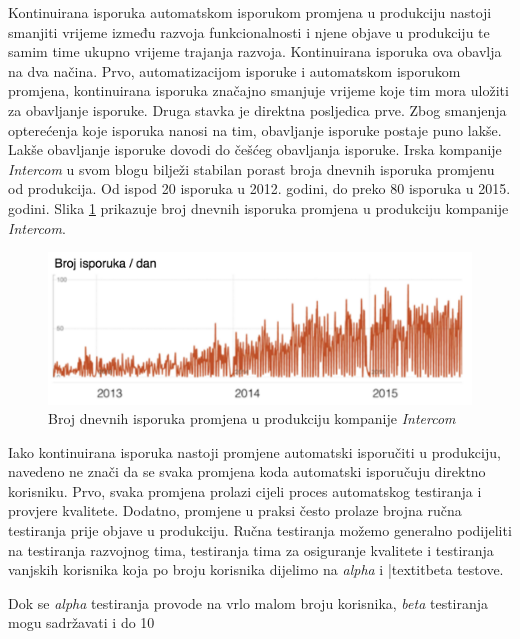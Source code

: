 \documentclass[times, utf8, diplomski, numeric]{fer}
\begin{document}
Kontinuirana isporuka automatskom isporukom promjena u produkciju nastoji smanjiti vrijeme između razvoja funkcionalnosti i njene objave u produkciju te samim time ukupno vrijeme trajanja razvoja. Kontinuirana isporuka ova obavlja na dva načina. Prvo, automatizacijom isporuke i automatskom isporukom promjena, kontinuirana isporuka značajno smanjuje vrijeme koje tim mora uložiti za obavljanje isporuke. Druga stavka je direktna posljedica prve. Zbog smanjenja opterećenja koje isporuka nanosi na tim, obavljanje isporuke postaje puno lakše. Lakše obavljanje isporuke dovodi do češćeg obavljanja isporuke. Irska kompanije \textit{Intercom} u svom blogu bilježi stabilan porast broja dnevnih isporuka promjenu od produkcija. Od ispod 20 isporuka u 2012. godini, do preko 80 isporuka u 2015. godini. Slika \ref{fig:IntercomShipsPerDay} prikazuje broj dnevnih isporuka promjena u produkciju kompanije \textit{Intercom}\citep{intercom:cd}.

\begin{figure}
\centering
\includegraphics[scale=0.7]{IntercomShipsPerDay}
\caption{Broj dnevnih isporuka promjena u produkciju kompanije \textit{Intercom}}
\label{fig:IntercomShipsPerDay}
\end{figure}

Iako kontinuirana isporuka nastoji promjene automatski isporučiti u produkciju, navedeno ne znači da se svaka promjena koda automatski isporučuju direktno korisniku. Prvo, svaka promjena prolazi cijeli proces automatskog testiranja i provjere kvalitete. Dodatno, promjene u praksi često prolaze brojna ručna testiranja prije objave u produkciju. Ručna testiranja možemo generalno podijeliti na testiranja razvojnog tima, testiranja tima za osiguranje kvalitete i testiranja vanjskih korisnika koja po broju korisnika dijelimo na \textit{alpha} i |textit{beta} testove.

Dok se \textit{alpha} testiranja provode na vrlo malom broju korisnika, \textit{beta} testiranja mogu sadržavati i do 10%
\end{document}
